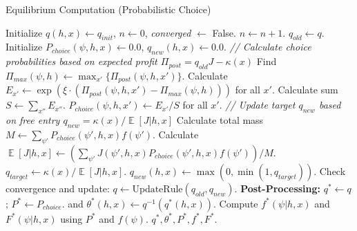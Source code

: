 \documentclass[
  11pt,
  letterpaper,
  DIV=11,
  numbers=noendperiod]{scrartcl}
\DeclareMathOperator*{\Exp}{\mathbb{E}} %
\theoremstyle{plain}
\theoremstyle{remark}
\begin{document}
\begin{algorithm}[H]
\caption{Equilibrium Computation (Probabilistic Choice)}
\label{alg:equilibrium_computation_concise}
\begin{algorithmic}[1]
    \State Initialize $q(h, x) \leftarrow q_{init}$, $n \leftarrow 0$, \textit{converged} $\leftarrow$ False.
        \State $n \leftarrow n + 1$.
        \State $q_{old} \leftarrow q$.
        \State Initialize $P_{choice}(\psi, h, x) \leftarrow 0.0$, $q_{new}(h, x) \leftarrow 0.0$.
        \Statex \textit{// Calculate choice probabilities based on expected profit $\Pi_{post} = q_{old}J - \kappa(x)$}
                \State Find $\Pi_{max}(\psi, h) \leftarrow \max_{x'} \{ \Pi_{post}(\psi, h, x') \}$.
                    \State Calculate $E_{x'} \leftarrow \exp(\xi \cdot (\Pi_{post}(\psi, h, x') - \Pi_{max}(\psi, h)))$ for all $x'$.
                    \State Calculate sum $S \leftarrow \sum_{x''} E_{x''}$.
                     $P_{choice}(\psi, h, x') \leftarrow E_{x'} / S$ for all $x'$. \EndIf
                \EndIf
            \EndFor
        \EndFor
        \Statex \textit{// Update target $q_{new}$ based on free entry $q_{new} = \kappa(x) / \Exp[J|h,x]$}
                \State Calculate total mass $M \leftarrow \sum_{\psi'} P_{choice}(\psi', h, x) f(\psi')$.
                    \State Calculate $\Exp[J|h,x] \leftarrow (\sum_{\psi'} J(\psi', h, x) P_{choice}(\psi', h, x) f(\psi')) / M$.
                    \If{$\Exp[J|h,x] > \kappa(x) + \epsilon$}
                        \State $q_{target} \leftarrow \kappa(x) / \Exp[J|h,x]$.
                        \State $q_{new}(h, x) \leftarrow \max(0, \min(1, q_{target}))$.
                    \EndIf
                \EndIf
            \EndFor
        \EndFor
        \State Check convergence and update: $q \leftarrow \text{UpdateRule}(q_{old}, q_{new})$.
    \EndWhile
    \Statex
    \State \textbf{Post-Processing:}
    \State $q^* \leftarrow q$; $P^* \leftarrow P_{choice}$. and  $\theta^*(h,x) \leftarrow q^{-1}(q^*(h,x))$.
    \State Compute $f^*(\psi|h,x)$ and $F^*(\psi|h,x)$ using $P^*$ and $f(\psi)$.
    \Statex
    \State \Return $q^*, \theta^*, P^*, f^*, F^*$.
\end{algorithmic}
\end{algorithm}
\end{document}
